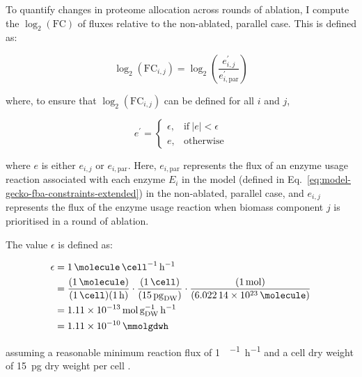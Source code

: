 To quantify changes in proteome allocation across rounds of ablation, I compute the $\log_{2}(\mathrm{FC})$ of fluxes relative to the non-ablated, parallel case.
This is defined as:

\begin{equation}
  \log_{2}(\mathrm{FC}_{i,j}) = \log_{2}\left( \frac{e_{i,j}^{\prime}}{e_{i, \mathrm{par}}^{\prime}} \right)
  \label{eq:model-foldchange}
\end{equation}

where, to ensure that $\log_{2}(\mathrm{FC}_{i,j})$ can be defined for all $i$ and $j$,

\begin{equation}
  e^{\prime} =
  \begin{cases}
    \epsilon, & \text{if}\ |e|<\epsilon \\
    e, & \text{otherwise}
  \end{cases}
  \label{eq:model-epsilon-round}
\end{equation}

where $e$ is either $e_{i,j}$ or $e_{i, \mathrm{par}}$.
Here, $e_{i, \mathrm{par}}$ represents the flux of an enzyme usage reaction associated with each enzyme $E_{i}$ in the model (defined in Eq.\ \ref{eq:model-gecko-fba-constraints-extended}) in the non-ablated, parallel case, and $e_{i,j}$ represents the flux of the enzyme usage reaction when biomass component $j$ is prioritised in a round of ablation.

The value $\epsilon$ is defined as:

\begin{equation}
  \begin{aligned}
    \epsilon &= \SI{1}{\molecule~\cell^{-1}~\hour^{-1}}\\
             &= \frac{(\SI{1}{\molecule})}{(\SI{1}{\cell})(\SI{1}{\hour})} \cdot \frac{(\SI{1}{\cell})}{(\SI{15}{\pico\gram_{DW}})} \cdot \frac{(\SI{1}{\mol})}{(\SI{6.02214d23}{\molecule)}}\\
             &= \SI{1.11d-13}{\mol~\gram_{DW}^{-1}~\hour^{-1}}\\
             &= \SI{1.11d-10}{\mmolgdwh}\\
  \end{aligned}
  \label{eq:model-epsilon}
\end{equation}

assuming a reasonable minimum reaction flux of \SI{1}{\molecule~\cell^{-1}~\hour^{-1}} and a cell dry weight of \SI{15}{\pico\gram} dry weight per cell \parencite{shermanGettingStartedYeast2002}.

